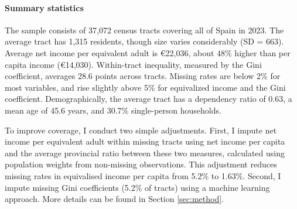 \paragraph{Summary statistics} The sample consists of 37,072 census tracts covering all of Spain in 2023. The average tract has 1,315 residents, though size varies considerably (SD = 663). Average net income per equivalent adult is €22,036, about 48\% higher than per capita income (€14,030). Within-tract inequality, measured by the Gini coefficient, averages 28.6 points across tracts. Missing rates are below 2\% for most variables, and rise slightly above 5\% for equivalized income and the Gini coefficient. Demographically, the average tract has a dependency ratio of 0.63, a mean age of 45.6 years, and 30.7\% single-person households.

\begin{table}[H]
\centering
{}
\end{table}

To improve coverage, I conduct two simple adjustments. First, I impute net income per equivalent adult within missing tracts using net income per capita and the average provincial ratio between these two measures, calculated using population weights from non-missing observations. This adjustment reduces missing rates in equivalised income per capita from 5.2\% to 1.63\%. Second, I impute missing Gini coefficients (5.2\% of tracts) using a machine learning approach. More details can be found in Section \ref{sec:method}.